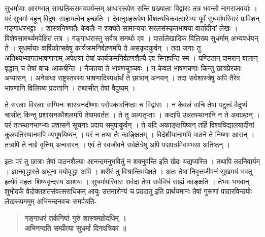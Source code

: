 सुधर्मायाः आरम्भात् साम्प्रतिकसमयपर्यन्तम् आधाररूपेण सन्ति प्रख्याताः विद्वांसः तत्र भवन्तो नागराजवर्याः । परं सुधर्मा बहून् विदुषः साहायत्वेन इच्छति । देवानुग्रहरूपेण विंशत्यधिकवत्सरेभ्यः पूर्वं सुधर्मापरिवारं प्राविशन् गङ्गाधरभट्टाः । शास्त्रनिष्णातैः केवलैः न शक्यते सामान्यया सरलसंस्कृतभाषया वार्तादीनां लेखः । विशेषसामर्थ्यमपेक्षितं तत्र । गङ्गाधरास्तु सर्वत्र समर्थाः एव । वार्तालेखादिकं विलिख्य सुधर्माम् अभ्यवर्धयन् ते । सुधर्मायाः वार्षिकोत्सवेषु कार्यक्रमनिर्वहणमपि ते असकृदकुर्वन् । तदा जनाः तु अतिथ्यभ्यागतभाषणानाम् अपेक्षया तेषां कार्यक्रमनिर्वहणशैल्यै एव स्निह्यन्ति स्म । पण्डितान् पामरान् बालान् वृद्धान् च तेषां वाचः आकर्षन्ति । नैजतया ते भाषणचुञ्चवः । न केवलं भाषणचणाः किन्तु छात्रप्रेरकाः अप्यासन् । अनेकधा राष्ट्रस्तरस्य भाषणादिस्पर्धार्थं ते छात्रान् अनयन् । तदा सर्वशास्त्रेषु अपि तैरेव भाषणानि विलिख्य प्रदत्तानि । तथासीत् तेषां वैदुष्यम् । 

ते सरलाः विरलाः वाग्मिनः शास्त्रनदीष्णाः परोपकारनिष्ठाः च विद्वांसः । न केवलं वाचि तेषां पटुत्वं वैदुष्यं चासीत् किन्तु प्रशासनकौशलमपि तेषामवर्तत । ते तु अल्पतृप्ताः । कदापि उन्नतस्थानानि न ते अवाञ्छन् । परं तत्स्थानभाग्भ्यः प्रशासने सूचनाः प्रदाय समुपाकुर्वन् । ते यदि अकाङ्क्षयिष्यन् तर्हि विश्वविद्यालयादीनां कुलपतिस्थानमपि व्यभूषयिष्यन् । परं न तथा तैः काङ्क्षितम् । विदेशीयानामपि पाठने ते निष्णाः आसन् । तत्रापि ते नाग्रे वृत्तिम् अन्वसरन् । एवं ते स्वजीवने सर्वक्षेत्रेषु अपि पद्मपत्रमिवाम्भसा अतिष्ठन् । 

इतः परं तु छात्राः तेषां पाठनशैल्याः आनन्दमनुभवितुं न शक्नुवन्ति इति खेदः यद्यप्यस्ति । तथापि तदनिवार्यम् । ज्ञानवृद्धास्ते अधुना वयोवृद्धाः अपि । शरीरं तु विश्रान्तिमपेक्षते । अतः तेषां निवृत्तजीवनं सुखमयं भवतु इत्येवं महतः शिष्यवृन्दस्य आशयः । सुधर्मापरिवारः सर्वदा तेषां सर्वविधं साह्यं काङ्क्षति । तेभ्यः भगवान् शुभोदर्कं वेदोक्तशतसंवत्सराधिकम् आयुः उत्तमारोग्यं च प्रददातु इति प्रार्थयमानः तेषां गुरूणां पादारविन्दयोः लेखरूपममुम् अभिनन्दनवचः समर्पयति-

\begin{verse}
\textbf{गङ्गाधरं तर्कनिष्ठं गुरुं शास्त्रमहोदधिम् ।\\
अभिनन्दति सम्प्रीत्या सुधर्मा दिनपत्रिका ॥}
\end{verse}

\articleend

